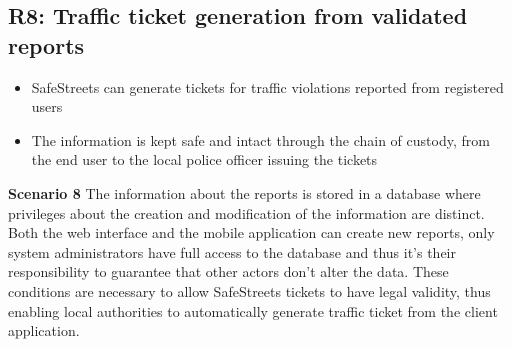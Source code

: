 \subsection{R8: Traffic ticket generation from validated reports}
\begin{itemize}
  \item SafeStreets can generate tickets for traffic violations reported from registered users
  \item The information is kept safe and intact through the chain of custody, from the end user to the local police officer issuing the tickets
\end{itemize}
\begin{description}
    \item \textbf{Scenario 8} \newline
        The information about the reports is stored in a database where privileges about the creation and modification of the information
        are distinct. Both the web interface and the mobile application can create new reports, only system administrators have full access to
        the database and thus it's their responsibility to guarantee that other actors don't alter the data. These conditions are necessary to allow SafeStreets tickets to have legal validity, thus enabling local authorities to automatically generate traffic ticket from the client application.
 

\end{description}

